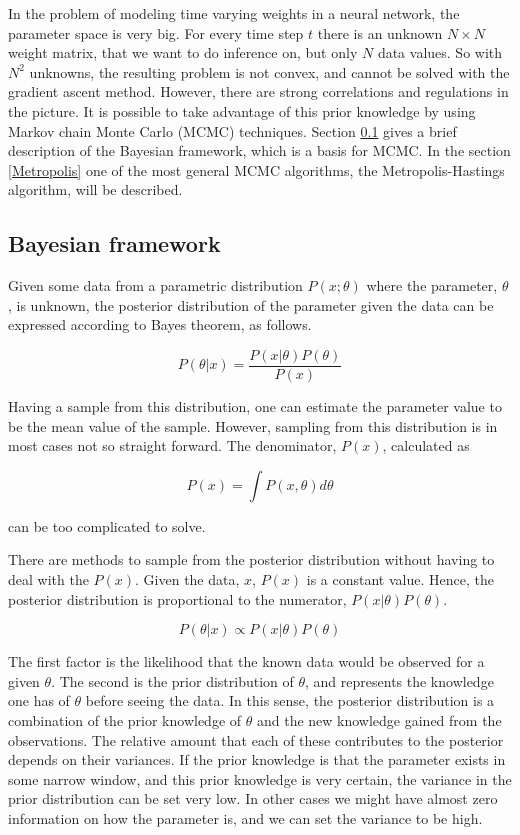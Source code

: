 In the problem of modeling time varying weights in a neural network, the parameter space is very big. For every time step $t$ there is an unknown $N \times N$ weight matrix, that we want to do inference on, but only $N$ data values. So with $N^2$ unknowns, the resulting problem is not convex, and cannot be solved with the gradient ascent method. However, there are strong correlations and regulations in the picture. It is possible to take advantage of this prior knowledge by using Markov chain Monte Carlo (MCMC) techniques. Section \ref{BayesianFW} gives a brief description of the Bayesian framework, which is a basis for MCMC. In the section \ref{Metropolis} one of the most general MCMC algorithms, the  Metropolis-Hastings algorithm, will be described.

\subsection{Bayesian framework}
\label{BayesianFW}

Given some data from a parametric distribution $P(x;\theta)$ where the parameter, $\theta$, is unknown, the posterior distribution of the parameter given the data can be expressed according to Bayes theorem, as follows.

\begin{equation}
    P(\theta | x) = \frac{P(x|\theta)P(\theta)}{P(x)}
\end{equation}

Having a sample from this distribution, one can estimate the parameter value to be the mean value of the sample. However, sampling from this distribution is in most cases not so straight forward. The denominator, $P(x)$, calculated as

\begin{equation}
    P(x) = \int P(x,\theta)d\theta
\end{equation}

can be too complicated to solve. 

There are methods to sample from the posterior distribution without having to deal with the $P(x)$. Given the data, $x$, $P(x)$ is a constant value. Hence, the posterior distribution is proportional to the numerator, $P(x|\theta)P(\theta)$. 

\begin{equation}
    P(\theta | x) \propto P(x|\theta)P(\theta)
\end{equation}

 The first factor is the likelihood that the known data would be observed for a given $\theta$. The second is the prior distribution of $\theta$, and represents the knowledge one has of $\theta$ before seeing the data. In this sense, the posterior distribution is a combination of the prior knowledge of $\theta$ and the new knowledge gained from the observations. The relative amount that each of these contributes to the posterior depends on their variances. If the prior knowledge is that the parameter exists in some narrow window, and this prior knowledge is very certain, the variance in the prior distribution can be set very low. In other cases we might have almost zero information on how the parameter is, and we can set the variance to be high. 

